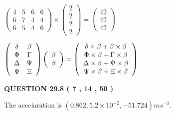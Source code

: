 \documentclass[12pt]{article}
\begin{document}
 
$\left( \begin{array}{ccccccccccccccc}
           4  & 
           5  & 
           6  & 
           6  \\ 
           6  & 
           7  & 
           4  & 
           4  \\ 
           6  & 
           5  & 
           4  & 
           6
\end{array}\right) \times
\left( \begin{array}{c}
           2  \\ 
           2  \\ 
           2  \\ 
           2
\end{array}\right)  =
\left( \begin{array}{c}
          42  \\ 
          42  \\ 
          42
\end{array}\right)  $
 
$  %
 \left( \begin{array}
 {
 c
 c
 }
 \delta & 
 \beta \\ 
 \Phi & 
 \Gamma \\ 
 \Delta & 
 \Psi \\ 
 \Psi & 
                    \Xi
 \end{array} \right)
 \left( \begin{array}
 {
 c
 }
 \beta \\ 
 \beta
 \end{array} \right)
=
 \left( \begin{array}
 {
 c
 }
  \delta \times  \beta +  \beta \times  \beta \\ 
  \Phi \times  \beta +  \Gamma \times  \beta \\ 
  \Delta \times  \beta +  \Psi \times  \beta \\ 
  \Psi \times  \beta +                     \Xi \times  \beta
 \end{array} \right)
$
 
 
 
  
\vspace{0.2in}
  
{\textbf{\Large{QUESTION
29.8 
 (           7 ,          14 ,          50 )
}}}
  
  
 
 
\noindent{}
 
 
  The accelaration is $  %
(
0.862,
5.2 \times 10^{-2},
-51.724)
ms^{-2} $.
 
\end{document}
